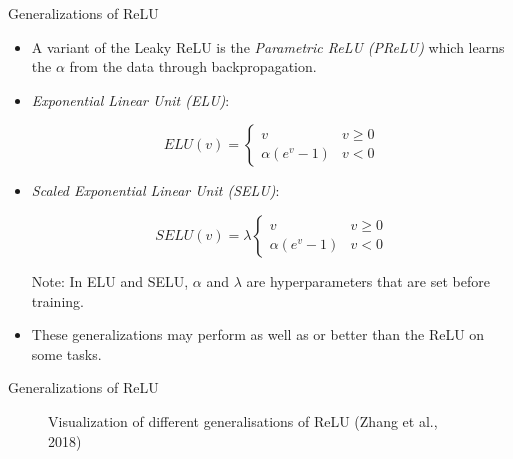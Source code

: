 \begin{frame} {Generalizations of ReLU}
  \begin{itemize}
    \item A variant of the Leaky ReLU is the \emph{Parametric ReLU (PReLU)} which learns the $\alpha$ from the data through backpropagation.

    \item \emph{Exponential Linear Unit (ELU)}:
    
    $$ ELU(v) = \begin{cases} 
          v & v \geq 0 \\
          \alpha (e^v - 1) & v < 0 
       \end{cases} $$

    \item \emph{Scaled Exponential Linear Unit (SELU)}:
    
    $$ SELU(v) = \lambda \begin{cases} 
          v & v \geq 0 \\
          \alpha (e^v - 1) & v < 0 
       \end{cases} $$
  
  {\scriptsize Note: In ELU and SELU, $\alpha$ and $\lambda$ are hyperparameters that are set before training.}
  \item These generalizations may perform as well as or better than the ReLU on some tasks. 
  \end{itemize}

\end{frame}

\begin{frame} {Generalizations of ReLU}
  \lz
  \lz
  \begin{figure}
    \centering
      \caption{Visualization of different generalisations of ReLU (Zhang et al., 2018)}
      \end{figure}
\end{frame}

